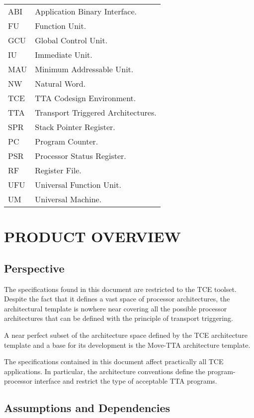 \documentclass[twoside]{tce}
\begin{document}
\begin{center}
\begin{longtable}{p{}p{}}
ABI   & Application Binary Interface.\\
FU    & Function Unit.\\
GCU   & Global Control Unit.\\
IU    & Immediate Unit.\\
MAU   & Minimum Addressable Unit.\\
NW    & Natural Word.\\
TCE   & TTA Codesign Environment. \\
TTA   & Transport Triggered Architectures. \\
SPR   & Stack Pointer Register. \\
PC    & Program Counter. \\
PSR   & Processor Status Register. \\
RF    & Register File.\\
UFU   & Universal Function Unit.\\
UM    & Universal Machine.\\
\end{longtable}
\end{center}


\chapter{PRODUCT OVERVIEW}

\section{Perspective}

The specifications found in this document are restricted to the TCE toolset.
Despite the fact that it defines a vast space of processor architectures,
the architectural template is nowhere near covering all the possible
processor architectures that can be defined with the principle of transport
triggering.

A near perfect subset of the architecture space defined by the TCE
architecture template and a base for its development is the Move-TTA
architecture template.

The specifications contained in this document affect practically all TCE
applications.  In particular, the architecture conventions define the
program-processor interface and restrict the type of acceptable TTA
programs.

\section{Assumptions and Dependencies}
\end{document}

